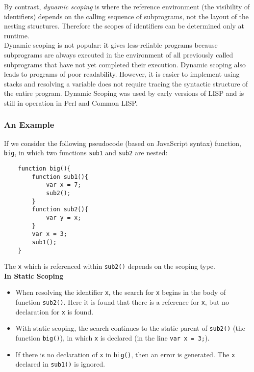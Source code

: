 By contrast, \textit{dynamic scoping} is where the reference environment (the visibility of identifiers) depends on the calling sequence of subprograms, not the layout of the nesting structures. Therefore the scopes of identifiers can be determined only at runtime. \\

Dynamic scoping is not popular: it gives less-reliable programs because subprograms are always executed in the environment of all previously called subprograms that have not yet completed their execution. Dynamic scoping also leads to programs of poor readability. However, it is easier to implement using stacks and resolving a variable does not require tracing the syntactic structure of the entire program. Dynamic Scoping was used by early versions of LISP and is still in operation in Perl and Common LISP. 

\subsubsection{An Example}
If we consider the following pseudocode (based on JavaScript syntax) function, \verb|big|, in which two functions \verb|sub1| and \verb|sub2| are nested:
\begin{verbatim}
    function big(){
        function sub1(){
            var x = 7;
            sub2();
        }
        function sub2(){
            var y = x;
        }
        var x = 3;
        sub1();
    }
\end{verbatim}

The \verb|x| which is referenced within \verb|sub2()| depends on the scoping type.\\

\textbf{In Static Scoping}
\begin{itemize}
    \item When resolving the identifier \verb|x|, the search for \verb|x| begins in the body of function \verb|sub2()|. Here it is found that there is a reference for \verb|x|, but no declaration for \verb|x| is found.
    \item With static scoping, the search continues to the static parent of \verb|sub2()| (the function \verb|big()|), in which \verb|x| is declared (in the line \verb|var x = 3;|).
    \item If there is no declaration of \verb|x| in \verb|big()|, then an error is generated. The \verb|x| declared in \verb|sub1()| is ignored. 
\end{itemize}


